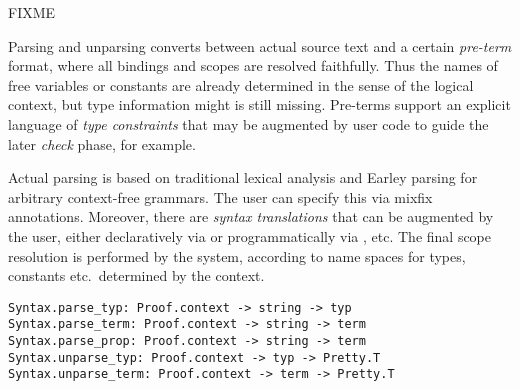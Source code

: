 \begin{isabellebody}
\begin{isamarkuptext}
  \begin{description}

  \item FIXME

  \end{description}%
\end{isamarkuptext}%
\isamarkuptrue%
%
\endisatagmlref
{\isafoldmlref}%
%
\isadelimmlref
%
\endisadelimmlref
%
\isamarkuptrue%
%
\begin{isamarkuptext}%
Parsing and unparsing converts between actual source text and
  a certain \emph{pre-term} format, where all bindings and scopes are
  resolved faithfully.  Thus the names of free variables or constants
  are already determined in the sense of the logical context, but type
  information might is still missing.  Pre-terms support an explicit
  language of \emph{type constraints} that may be augmented by user
  code to guide the later \emph{check} phase, for example.

  Actual parsing is based on traditional lexical analysis and Earley
  parsing for arbitrary context-free grammars.  The user can specify
  this via mixfix annotations.  Moreover, there are \emph{syntax
  translations} that can be augmented by the user, either
  declaratively via \hyperlink{command.translations}{\mbox{}} or programmatically via
  \hyperlink{command.parse-translation}{\mbox{}}, \hyperlink{command.print-translation}{\mbox{}} etc.  The
  final scope resolution is performed by the system, according to name
  spaces for types, constants etc.\ determined by the context.%
\end{isamarkuptext}%
\isamarkuptrue%
%
\isadelimmlref
%
\endisadelimmlref
%
\isatagmlref
%
\begin{isamarkuptext}%
\begin{mldecls}
  \verb|Syntax.parse_typ: Proof.context -> string -> typ| \\
  \verb|Syntax.parse_term: Proof.context -> string -> term| \\
  \verb|Syntax.parse_prop: Proof.context -> string -> term| \\
  \verb|Syntax.unparse_typ: Proof.context -> typ -> Pretty.T| \\
  \verb|Syntax.unparse_term: Proof.context -> term -> Pretty.T| \\
  \end{mldecls}


\end{isamarkuptext}
\end{isabellebody}
